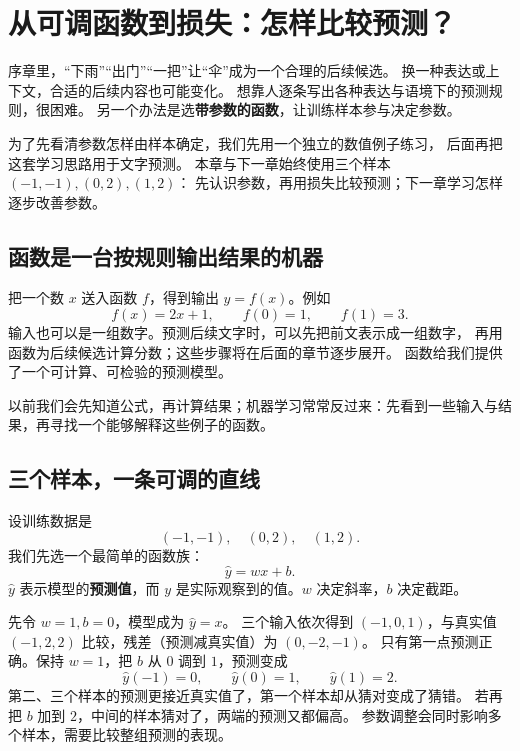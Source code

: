 \chapterrule
\section{从可调函数到损失：怎样比较预测？}
\label{intro:functions-and-loss}

序章里，“下雨”“出门”“一把”让“伞”成为一个合理的后续候选。
换一种表达或上下文，合适的后续内容也可能变化。
想靠人逐条写出各种表达与语境下的预测规则，很困难。
另一个办法是选\textbf{带参数的函数}，让训练样本参与决定参数。

为了先看清参数怎样由样本确定，我们先用一个独立的数值例子练习，
后面再把这套学习思路用于文字预测。
本章与下一章始终使用三个样本 $(-1,-1),(0,2),(1,2)$：
先认识参数，再用损失比较预测；下一章学习怎样逐步改善参数。


\subsection{函数是一台按规则输出结果的机器}
\label{concept:function}

把一个数 $x$ 送入函数 $f$，得到输出 $y=f(x)$。例如
\[
f(x)=2x+1,\qquad f(0)=1,\qquad f(1)=3.
\]
输入也可以是一组数字。预测后续文字时，可以先把前文表示成一组数字，
再用函数为后续候选计算分数；这些步骤将在后面的章节逐步展开。
函数给我们提供了一个可计算、可检验的预测模型。

以前我们会先知道公式，再计算结果；机器学习常常反过来：先看到一些输入与结果，再寻找一个能够解释这些例子的函数。

\subsection{三个样本，一条可调的直线}
\label{concept:sample}

设训练数据是
\[
(-1,-1),\quad(0,2),\quad(1,2).
\]
我们先选一个最简单的函数族：
\begin{equation}
\widehat{y}=wx+b.
\label{eq:line-first}
\end{equation}
$\widehat{y}$ 表示模型的\textbf{预测值}，而 $y$ 是实际观察到的值。$w$ 决定斜率，$b$ 决定截距。

先令 $w=1,b=0$，模型成为 $\widehat{y}=x$。
三个输入依次得到 $(-1,0,1)$，与真实值 $(-1,2,2)$ 比较，残差（预测减真实值）为 $(0,-2,-1)$。
只有第一点预测正确。保持 $w=1$，把 $b$ 从 $0$ 调到 $1$，预测变成
\[
\widehat{y}(-1)=0,\qquad \widehat{y}(0)=1,\qquad \widehat{y}(1)=2.
\]
第二、三个样本的预测更接近真实值了，第一个样本却从猜对变成了猜错。
若再把 $b$ 加到 $2$，中间的样本猜对了，两端的预测又都偏高。
参数调整会同时影响多个样本，需要比较整组预测的表现。


